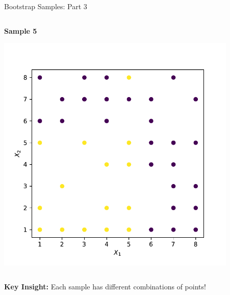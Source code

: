 \documentclass[9pt]{beamer}
\newcommand{\fitpic}[1]{\begin{adjustbox}{max width=\linewidth, max totalheight=0.78\textheight}#1\end{adjustbox}}
\begin{document}
\begin{frame}{Bootstrap Samples: Part 3}
\begin{center}
\begin{columns}
\begin{column}{0.45\textwidth}
\centering
\textbf{Sample 5}

\fitpic{\includegraphics[width = 0.9\textwidth]{../assets/ensemble/figures/dataset-rnd-4}}
\end{column}

\begin{column}{0.45\textwidth}
\centering
\end{column}
\end{columns}
\end{center}

\begin{keypointsbox}
\textbf{Key Insight:} Each sample has different combinations of points!
\end{keypointsbox}
\end{frame}
\end{document}
